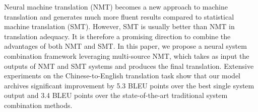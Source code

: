 Neural machine translation (NMT) becomes a new approach to machine translation and generates much more fluent results compared to statistical machine translation (SMT). However, SMT is usually better than NMT in translation adequacy. It is therefore a promising direction to combine the advantages of both NMT and SMT. In this paper, we propose a neural system combination framework leveraging multi-source NMT, which takes as input the outputs of NMT and SMT systems and produces the final translation. Extensive experiments on the Chinese-to-English translation task show that our model archives significant improvement by 5.3 BLEU points over the best single system output and 3.4 BLEU points over the state-of-the-art traditional system combination methods.
